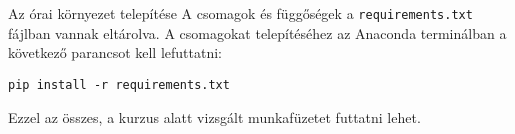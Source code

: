 \documentclass[english, aspectratio=169]{beamer}
\begin{document}
\begin{frame}{Az órai környezet telepítése}
A csomagok és függőségek a \texttt{requirements.txt} fájlban vannak eltárolva. A csomagokat telepítéséhez az Anaconda terminálban a következő parancsot kell lefuttatni:
\begin{block}{}
\texttt{pip install -r requirements.txt}
\end{block}
Ezzel az összes, a kurzus alatt vizsgált munkafüzetet futtatni lehet.
\end{frame}
\end{document}
